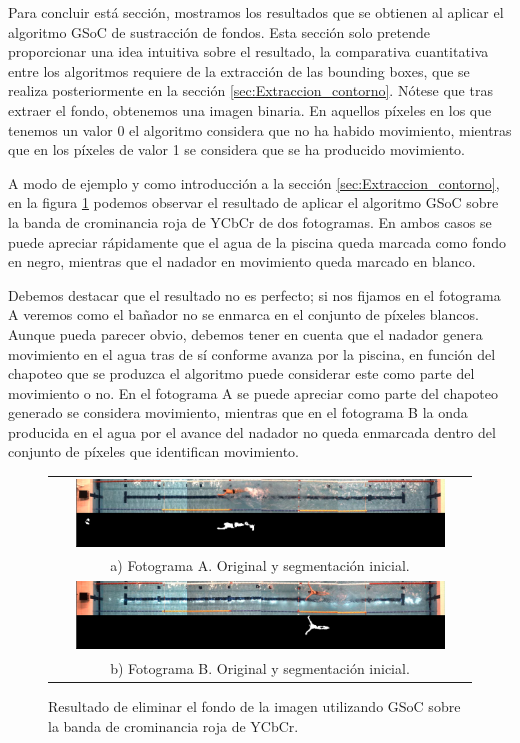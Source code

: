 Para concluir está sección, mostramos los resultados que se obtienen al aplicar el algoritmo GSoC de sustracción de fondos. Esta sección solo pretende proporcionar una idea intuitiva sobre el resultado, la comparativa cuantitativa entre los algoritmos requiere de la extracción de las bounding boxes, que se realiza posteriormente en la sección \ref{sec:Extraccion_contorno}. Nótese que tras extraer el fondo, obtenemos una imagen binaria. En aquellos píxeles en los que tenemos un valor 0 el algoritmo considera que no ha habido movimiento, mientras que en los píxeles de valor 1 se considera que se ha producido movimiento. 

A modo de ejemplo y como introducción a la sección \ref{sec:Extraccion_contorno}, en la figura \ref{fig:ejemplosinbbox} podemos observar el resultado de aplicar el algoritmo GSoC sobre la banda de crominancia roja de YCbCr de dos fotogramas. En ambos casos se puede apreciar rápidamente que el agua de la piscina queda marcada como fondo en negro, mientras que el nadador en movimiento queda marcado en blanco. 

Debemos destacar que el resultado no es perfecto; si nos fijamos en el fotograma A veremos como el bañador no se enmarca en el conjunto de píxeles blancos. Aunque pueda parecer obvio, debemos tener en cuenta que el nadador genera movimiento en el agua tras de sí conforme avanza por la piscina, en función del chapoteo que se produzca el algoritmo puede considerar este como parte del movimiento o no. En el fotograma A se puede apreciar como parte del chapoteo generado se considera movimiento, mientras que en el fotograma B la onda producida en el agua por el avance del nadador no queda enmarcada dentro del conjunto de píxeles que identifican movimiento.

\begin{figure}[h!]
    \centering
    \begin{tabular}{c}
          \includegraphics[width=0.9\textwidth,height=0.9\textheight,keepaspectratio]{imagenes/parte_BS/PROCESAR_SIN_BBOX_I.png} \\
          a) Fotograma A. Original y segmentación inicial. \\
          \includegraphics[width=0.9\textwidth,height=0.9\textheight,keepaspectratio]{imagenes/parte_BS/PROCESAR_SIN_BBOX_II.png} \\
          b) Fotograma B. Original y segmentación inicial. \\
     \end{tabular}
     \caption{Resultado de eliminar el fondo de la imagen utilizando GSoC sobre la banda de crominancia roja de YCbCr.}
     \label{fig:ejemplosinbbox}
\end{figure}


